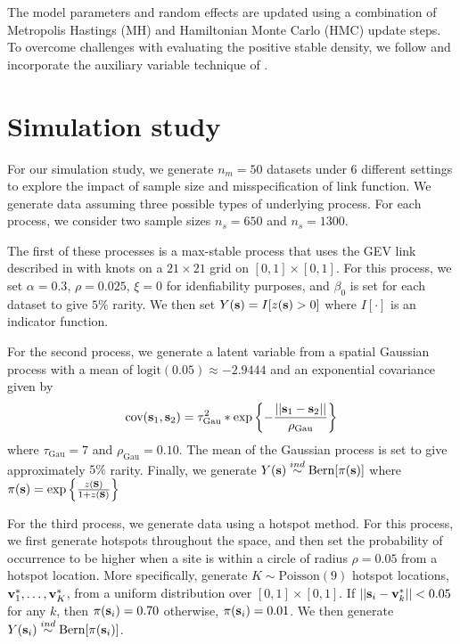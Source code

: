 \documentclass[11pt]{article}
\begin{document}
The model parameters and random effects are updated using a combination of Metropolis Hastings (MH) and Hamiltonian Monte Carlo (HMC) update steps.
To overcome challenges with evaluating the positive stable density, we follow \citet{Reich2012} and incorporate the auxiliary variable technique of \citet{Stephenson2009}.


\section{Simulation study}\label{rbs:sim}

For our simulation study, we generate $n_m = 50$ datasets under 6 different settings to explore the impact of sample size and misspecification of link function.
We generate data assuming three possible types of underlying process.
For each process, we consider two sample sizes $n_s = 650$ and $n_s = 1300$.

The first of these processes is a max-stable process that uses the GEV link described in  with knots on a $21 \times 21$ grid on $[0, 1] \times [0, 1]$.
For this process, we set $\alpha = 0.3$, $\rho = 0.025$, $\xi = 0$ for idenfiability purposes, and $\beta_0$ is set for each dataset to give $5\%$ rarity.
We then set $Y(\mbox{\bf s}) = I[z(\mbox{\bf s}) > 0]$ where $I[\cdot]$ is an indicator function.

For the second process, we generate a latent variable from a spatial Gaussian process with a mean of $\text{logit}(0.05) \approx -2.9444$ and an exponential covariance given by
\begin{align}
  \text{cov}(\mbox{\bf s}_1, \mbox{\bf s}_2) = \tau_\text{Gau}^2 * \exp\left\{- \frac{||\mbox{\bf s}_1 - \mbox{\bf s}_2||}{\rho_\text{Gau}}\right\}
\end{align}
where $\tau_\text{Gau} = 7$ and $\rho_\text{Gau} = 0.10$.
The mean of the Gaussian process is set to give approximately $5\%$ rarity.
Finally, we generate $Y(\mbox{\bf s}) \stackrel{ind}{\sim} \text{Bern}[\pi(\mbox{\bf s})]$
where $\pi(\mbox{\bf s}) = \exp\left\{ \frac{z(\mbox{\bf s})}{1 + z(\mbox{\bf s})} \right\}$

For the third process, we generate data using a hotspot method.
For this process, we first generate hotspots throughout the space, and then set the probability of occurrence to be higher when a site is within a circle of radius $\rho = 0.05$ from a hotspot location.
More specifically, generate $K \sim \text{Poisson}(9)$ hotspot locations, $\mbox{\bf v}^*_1, \ldots, \mbox{\bf v}^*_K$, from a uniform distribution over $[0, 1] \times [0, 1]$.
If $||\mbox{\bf s}_i - \mbox{\bf v}^*_k|| < 0.05$ for any $k$, then $\pi(\mbox{\bf s}_i) = 0.70$ otherwise, $\pi(\mbox{\bf s}_i) = 0.01$.
We then generate $Y(\mbox{\bf s}_i) \stackrel{ind}{\sim} \text{Bern}[\pi(\mbox{\bf s}_i)]$.
\end{document}
